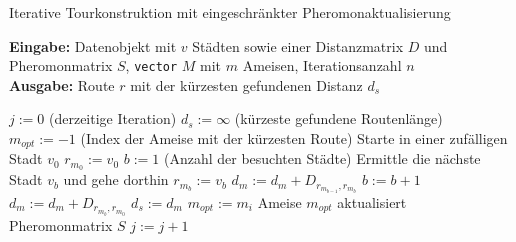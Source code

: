 \documentclass[doktyp=barbeit, sprache=german]{TUBAFarbeiten}
\begin{document}
\begin{algorithm}
\caption{Iterative Tourkonstruktion mit eingeschränkter Pheromonaktualisierung}
\label{MMASIterativeTour}
\textbf{Eingabe:} Datenobjekt mit $v$ Städten sowie einer Distanzmatrix $D$ und Pheromonmatrix $S$, \texttt{vector} $M$ mit $m$ Ameisen, Iterationsanzahl $n$
\\\textbf{Ausgabe:} Route $r$ mit der kürzesten gefundenen Distanz $d_s$
\begin{algorithmic}[1]
\State $j := 0$ (derzeitige Iteration)
\State $d_s := \infty$ (kürzeste gefundene Routenlänge)
\State $m_{opt} := -1$ (Index der Ameise mit der kürzesten Route)
\State Starte in einer zufälligen Stadt $v_0$
\State $r_{m_0} := v_0$
\State $b := 1$ (Anzahl der besuchten Städte)
\State Ermittle die nächste Stadt $v_b$ und gehe dorthin
\State $r_{m_b} := v_b$
\State $d_m := d_m + D_{r_{m_{b-1}},r_{m_b}}$
\State $b := b + 1$
\EndWhile
\State $d_m := d_m + D_{r_{m_b},r_{m_0}}$
\State $d_s := d_m$
\State $m_{opt} := m_i$
\EndIf
\EndFor
\State Ameise $m_{opt}$ aktualisiert Pheromonmatrix $S$
\State $j := j + 1$
\EndWhile
\end{algorithmic}
\end{algorithm}
\end{document}
